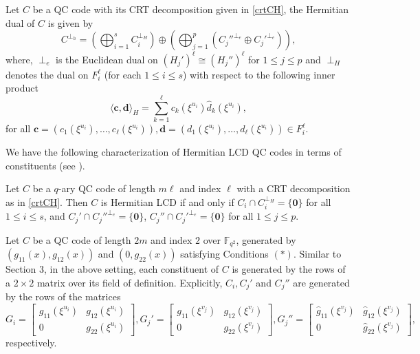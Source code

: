 \documentclass[a4paper,12pt]{article}
\begin{document}
\begin{theorem}\label{crtCdualh}
Let $C$ be a QC code with its CRT decomposition given in \eqref{crtCH}, the Hermitian dual of $C$ is given by
\begin{equation} 
	C^{\perp_h} = \left(\bigoplus_{i=1}^{s} C_i^{\perp_H} \right) 
	\oplus
	\left(\bigoplus_{j=1}^{p} \left(  C_j''^{\perp_e}
	\oplus   C_j'^{\perp_e}   \right) \right),
\end{equation} 
where, $\perp_e$ is the Euclidean dual on $(H_j')^\ell \cong (H_j'')^\ell$ for $1\leq j\leq p$ and  ${\perp_H}$ denotes the dual on $F_i^\ell$ (for each $1\le i \le s$) with respect to the following inner product 
\begin{equation}
	\langle \textbf{c},\textbf{d} \rangle_H= \sum_{k=1}^\ell c_k(\xi^{u_i})\hat{d}_k(\xi^{u_i}),
\end{equation}
for all
$
\textbf{c} = (c_1(\xi^{u_i}), \dots,  c_\ell(\xi^{u_i})), \textbf{d} = (d_1(\xi^{u_i}), \dots,  d_\ell(\xi^{u_i})) \in F_i^\ell.
$ 	
\end{theorem}
We have the following characterization of Hermitian LCD QC codes in terms of constituents (see \cite[Eq. (IV.16)]{ezerman2025}).

\begin{theorem} \label{qclcdH} Let $C$ be a $q$-ary QC code of length $m\ell$ and index $\ell$ with a CRT decomposition as in \eqref{crtCH}.
	Then $C$ is Hermitian LCD if and only if 
	$C_i \cap C_i^{\perp_H} = \{\mathbf{0}\}$ for all $1 \le i \le s$, and $C_j' \cap C_j''^{\perp_e} = \{\mathbf{0}\}$, $C_j'' \cap C_j'^{\perp_e} = \{\mathbf{0}\}$ 
for all $1\le j \le p$. 
\end{theorem}

Let $C$ be a QC code of length $2m$ and index $2$ over  $\mathbb{F}_{q^2}$, generated by $(g_{11}(x),g_{12}(x))$ and $(0,g_{22}(x))$ satisfying Conditions $(\ast)$. Similar to Section 3, in the above setting, each constituent of $C$ is generated by the rows of a $2 \times 2$ matrix over its field of definition. Explicitly, $C_i, C_j'$ and $C_j''$ are generated by the rows of the matrices
$$
G_i=  \begin{bmatrix}
	g_{11}(\xi^{u_i}) & g_{12}(\xi^{u_i}) \\
	0 & g_{22}(\xi^{u_i}) 
\end{bmatrix} ,
G_j'=   \begin{bmatrix}
	g_{11}(\xi^{v_j}) & g_{12}(\xi^{v_j}) \\
	0 & g_{22}(\xi^{v_j}) 
\end{bmatrix}  ,
G_j''=   \begin{bmatrix}
	\hat{g}_{11}(\xi^{v_j}) & \hat{g}_{12}(\xi^{v_j}) \\
	0 & \hat{g}_{22}(\xi^{v_j}) 
\end{bmatrix}  ,
$$
respectively. 
\end{document}
